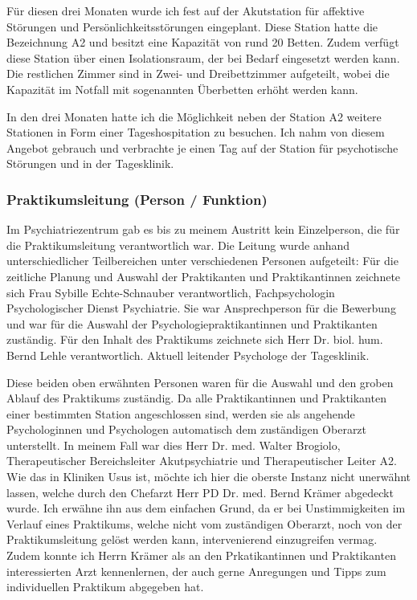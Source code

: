 \documentclass[jou,apacite]{apa6}
\begin{document}
Für diesen drei Monaten wurde ich fest auf der Akutstation für affektive Störungen und Persönlichkeitsstörungen eingeplant. Diese Station hatte die Bezeichnung A2 und besitzt eine Kapazität von rund 20 Betten. Zudem verfügt diese Station über einen Isolationsraum, der bei Bedarf eingesetzt werden kann. Die restlichen Zimmer sind in Zwei- und Dreibettzimmer aufgeteilt, wobei die Kapazität im Notfall mit sogenannten Überbetten erhöht werden kann. 

In den drei Monaten hatte ich die Möglichkeit neben der Station A2 weitere Stationen in Form einer Tageshospitation zu besuchen. Ich nahm von diesem Angebot gebrauch und verbrachte je einen Tag auf der Station für psychotische Störungen und in der Tagesklinik. 

\subsubsection{Praktikumsleitung (Person / Funktion)}
Im Psychiatriezentrum gab es bis zu meinem Austritt kein Einzelperson, die für die Praktikumsleitung verantwortlich war. Die Leitung wurde anhand unterschiedlicher Teilbereichen unter verschiedenen Personen aufgeteilt: Für die zeitliche Planung und Auswahl der Praktikanten und Praktikantinnen zeichnete sich Frau Sybille Echte-Schnauber verantwortlich, Fachpsychologin Psychologischer Dienst Psychiatrie. Sie war Ansprechperson für die Bewerbung und war für die Auswahl der Psychologiepraktikantinnen und Praktikanten zuständig. Für den Inhalt des Praktikums zeichnete sich Herr Dr. biol. hum. Bernd Lehle verantwortlich. Aktuell leitender Psychologe der Tagesklinik. 

Diese beiden oben erwähnten Personen waren für die Auswahl und den groben Ablauf des Praktikums zuständig. Da alle Praktikantinnen und Praktikanten einer bestimmten Station angeschlossen sind, werden sie als angehende Psychologinnen und Psychologen automatisch dem zuständigen Oberarzt unterstellt. In meinem Fall war dies Herr Dr. med. Walter Brogiolo, Therapeutischer Bereichsleiter Akutpsychiatrie und Therapeutischer Leiter A2. Wie das in Kliniken Usus ist, möchte ich hier die oberste Instanz nicht unerwähnt lassen, welche durch den Chefarzt Herr PD Dr. med. Bernd Krämer abgedeckt wurde. Ich erwähne ihn aus dem einfachen Grund, da er bei Unstimmigkeiten im Verlauf eines Praktikums, welche nicht vom zuständigen Oberarzt, noch von der Praktikumsleitung gelöst werden kann, intervenierend einzugreifen vermag. Zudem konnte ich Herrn Krämer als an den Prkatikantinnen und Praktikanten interessierten Arzt kennenlernen, der auch gerne Anregungen und Tipps zum individuellen Praktikum abgegeben hat.
\end{document}
